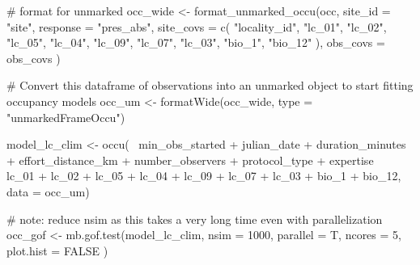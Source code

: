 \documentclass[
]{article}
\newenvironment{Shaded}{}{}
\newcommand{\CommentTok}[1]{\textcolor[rgb]{0.00,0.50,0.00}{#1}}
\newcommand{\DataTypeTok}[1]{#1}
\newcommand{\DecValTok}[1]{#1}
\newcommand{\KeywordTok}[1]{\textcolor[rgb]{0.00,0.00,1.00}{#1}}
\newcommand{\NormalTok}[1]{#1}
\newcommand{\OperatorTok}[1]{#1}
\newcommand{\OtherTok}[1]{\textcolor[rgb]{1.00,0.25,0.00}{#1}}
\newcommand{\StringTok}[1]{\textcolor[rgb]{0.00,0.50,0.50}{#1}}
\begin{document}
\begin{Shaded}
\begin{Highlighting}[]
{  \CommentTok{# format for unmarked}
\NormalTok{  occ_wide <-}\StringTok{ }\KeywordTok{format_unmarked_occu}\NormalTok{(occ,}
    \DataTypeTok{site_id =} \StringTok{"site"}\NormalTok{,}
    \DataTypeTok{response =} \StringTok{"pres_abs"}\NormalTok{,}
    \DataTypeTok{site_covs =} \KeywordTok{c}\NormalTok{(}
      \StringTok{"locality_id"}\NormalTok{, }\StringTok{"lc_01"}\NormalTok{, }\StringTok{"lc_02"}\NormalTok{, }\StringTok{"lc_05"}\NormalTok{,}
      \StringTok{"lc_04"}\NormalTok{, }\StringTok{"lc_09"}\NormalTok{, }\StringTok{"lc_07"}\NormalTok{, }\StringTok{"lc_03"}\NormalTok{, }\StringTok{"bio_1"}\NormalTok{, }\StringTok{"bio_12"}
\NormalTok{    ),}
    \DataTypeTok{obs_covs =}\NormalTok{ obs_covs}
\NormalTok{  )}

  \CommentTok{# Convert this dataframe of observations into an unmarked object to start fitting occupancy models}
\NormalTok{  occ_um <-}\StringTok{ }\KeywordTok{formatWide}\NormalTok{(occ_wide, }\DataTypeTok{type =} \StringTok{"unmarkedFrameOccu"}\NormalTok{)}

\NormalTok{  model_lc_clim <-}\StringTok{ }\KeywordTok{occu}\NormalTok{(}\OperatorTok{~}\StringTok{ }\NormalTok{min_obs_started }\OperatorTok{+}
\StringTok{    }\NormalTok{julian_date }\OperatorTok{+}
\StringTok{    }\NormalTok{duration_minutes }\OperatorTok{+}
\StringTok{    }\NormalTok{effort_distance_km }\OperatorTok{+}
\StringTok{    }\NormalTok{number_observers }\OperatorTok{+}
\StringTok{    }\NormalTok{protocol_type }\OperatorTok{+}
\StringTok{    }\NormalTok{expertise }\OperatorTok{~}\StringTok{ }\NormalTok{lc_}\DecValTok{01} \OperatorTok{+}\StringTok{ }\NormalTok{lc_}\DecValTok{02} \OperatorTok{+}\StringTok{ }\NormalTok{lc_}\DecValTok{05} \OperatorTok{+}
\StringTok{    }\NormalTok{lc_}\DecValTok{04} \OperatorTok{+}\StringTok{ }\NormalTok{lc_}\DecValTok{09} \OperatorTok{+}\StringTok{ }\NormalTok{lc_}\DecValTok{07} \OperatorTok{+}\StringTok{ }\NormalTok{lc_}\DecValTok{03} \OperatorTok{+}\StringTok{ }\NormalTok{bio_}\DecValTok{1} \OperatorTok{+}\StringTok{ }\NormalTok{bio_}\DecValTok{12}\NormalTok{, }\DataTypeTok{data =}\NormalTok{ occ_um)}

  \CommentTok{# note: reduce nsim as this takes a very long time even with parallelization}
\NormalTok{  occ_gof <-}\StringTok{ }\KeywordTok{mb.gof.test}\NormalTok{(model_lc_clim,}
    \DataTypeTok{nsim =} \DecValTok{1000}\NormalTok{, }\DataTypeTok{parallel =}\NormalTok{ T, }\DataTypeTok{ncores =} \DecValTok{5}\NormalTok{,}
    \DataTypeTok{plot.hist =} \OtherTok{FALSE}
\NormalTok{  )}

}
\end{Highlighting}
\end{Shaded}
\end{document}
